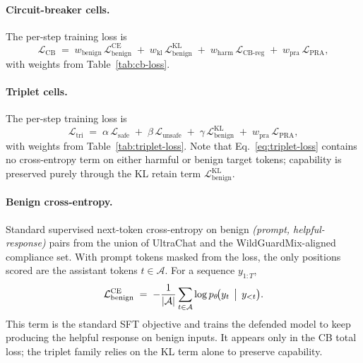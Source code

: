 \paragraph{Circuit-breaker cells.}
The per-step training loss is
\begin{equation}
  \mathcal{L}_\text{CB}
  \;=\;
  w_\text{benign}\,\mathcal{L}^\text{CE}_\text{benign}
  \;+\;
  w_\text{kl}\,\mathcal{L}^\text{KL}_\text{benign}
  \;+\;
  w_\text{harm}\,\mathcal{L}_\text{CB-reg}
  \;+\;
  w_\text{pra}\,\mathcal{L}_\text{PRA},
  \label{eq:cb-loss}
\end{equation}
with weights from Table~\ref{tab:cb-loss}.

\paragraph{Triplet cells.}
The per-step training loss is
\begin{equation}
  \mathcal{L}_\text{tri}
  \;=\;
  \alpha\,\mathcal{L}_\text{safe}
  \;+\;
  \beta\,\mathcal{L}_\text{unsafe}
  \;+\;
  \gamma\,\mathcal{L}^\text{KL}_\text{benign}
  \;+\;
  w_\text{pra}\,\mathcal{L}_\text{PRA},
  \label{eq:triplet-loss}
\end{equation}
with weights from Table~\ref{tab:triplet-loss}.  Note that
Eq.~\ref{eq:triplet-loss} contains no cross-entropy term on either
harmful or benign target tokens; capability is preserved purely
through the KL retain term \(\mathcal{L}^\text{KL}_\text{benign}\).

\paragraph{Benign cross-entropy.}
Standard supervised next-token cross-entropy on benign \emph{(prompt,
helpful-response)} pairs from the union of UltraChat and the
WildGuardMix-aligned compliance set.  With prompt tokens masked from
the loss, the only positions scored are the assistant tokens
\(t \in \mathcal{A}\).  For a sequence \(y_{1:T}\),
\begin{equation}
  \mathcal{L}^\text{CE}_\text{benign}
  \;=\;
  -\frac{1}{|\mathcal{A}|}
   \sum_{t \in \mathcal{A}}
   \log p_\theta\!\bigl(y_t \,\bigm|\, y_{<t}\bigr).
  \label{eq:benign-ce}
\end{equation}
This term is the standard SFT objective and trains the defended
model to keep producing the helpful response on benign inputs.  It
appears only in the CB total loss; the triplet family relies on the
KL term alone to preserve capability.

